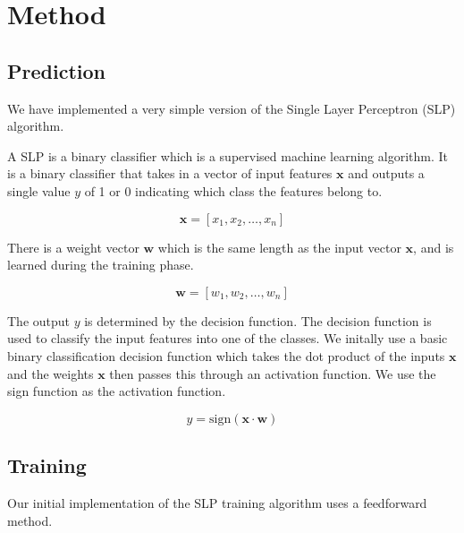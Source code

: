 \section{Method}
\label{sec:method}

\subsection{Prediction}

We have implemented a very simple version of the Single Layer Perceptron (SLP) algorithm.

A SLP is a binary classifier which is a supervised machine learning algorithm. It is a binary classifier that takes in a vector of input features $\boldsymbol{x}$ and outputs a single value $y$ of 1 or 0 indicating which class the features belong to. 

\begin{equation}
\boldsymbol{x} = [x_1, x_2, \ldots, x_n]
\label{eq:input_vector_x}
\end{equation}

There is a weight vector $\boldsymbol{w}$ which is the same length as the input vector $\boldsymbol{x}$, and is learned during the training phase.

\begin{equation}
  \boldsymbol{w} = [w_1, w_2, \ldots, w_n]
  \label{eq:weight_vector_w}
\end{equation}

The output $y$ is determined by the decision function. The decision function is used to classify the input features into one of the classes. We initally use a basic binary classification decision function which takes the dot product of the inputs $\boldsymbol{x}$ and the weights $\boldsymbol{x}$ then passes this through an activation function. We use the sign function as the activation function.


\begin{equation}
  y = \text{sign}(\boldsymbol{x} \cdot \boldsymbol{w})
  \label{eq:decision_function}
\end{equation}


\subsection{Training}

Our initial implementation of the SLP training algorithm uses a feedforward method.

